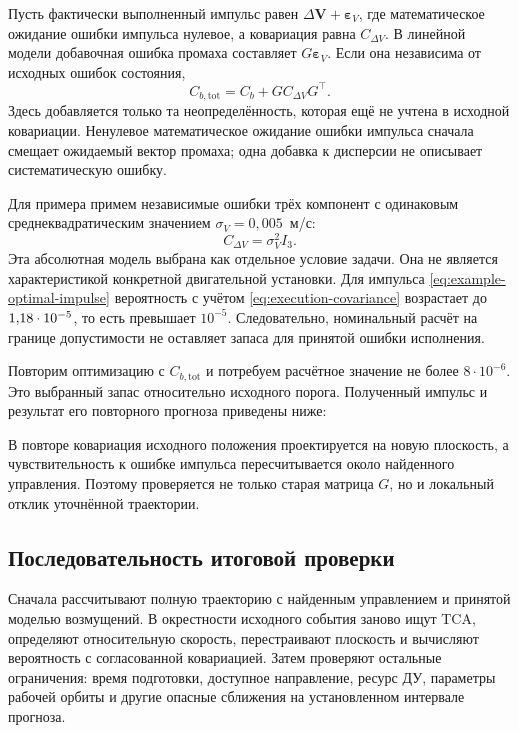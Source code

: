 \documentclass[a4paper,11pt]{article}
\newcommand{\vect}[1]{\boldsymbol{#1}}
\numberwithin{equation}{section}
\begin{document}
Пусть фактически выполненный импульс равен
$\Delta\vect V+\vect\varepsilon_V$, где математическое ожидание ошибки импульса
нулевое, а ковариация равна $C_{\Delta V}$. В линейной модели
добавочная ошибка промаха составляет $G\vect\varepsilon_V$.
Если она независима от исходных ошибок состояния,
\begin{equation}
 C_{b,\mathrm{tot}}=C_b+G C_{\Delta V}G^\top.
 \label{eq:execution-covariance}
\end{equation}
Здесь добавляется только та неопределённость, которая ещё
не учтена в исходной ковариации. Ненулевое математическое ожидание ошибки импульса
сначала смещает ожидаемый вектор промаха; одна добавка
к дисперсии не описывает систематическую ошибку.

Для примера примем независимые ошибки трёх компонент
с одинаковым среднеквадратическим значением
$\sigma_V=0{,}005$~м/с:
\begin{equation}
 C_{\Delta V}=\sigma_V^2 I_3.
 \label{eq:example-execution-error}
\end{equation}
Эта абсолютная модель выбрана как отдельное условие задачи.
Она не является характеристикой конкретной двигательной установки.
Для импульса \eqref{eq:example-optimal-impulse} вероятность
с учётом \eqref{eq:execution-covariance} возрастает до
$1{,}18\cdot10^{-5}$, то есть превышает $10^{-5}$.
Следовательно, номинальный расчёт на границе допустимости
не оставляет запаса для принятой ошибки исполнения.

Повторим оптимизацию с $C_{b,\mathrm{tot}}$ и потребуем
расчётное значение не более $8\cdot10^{-6}$.
Это выбранный запас относительно исходного порога.
Полученный импульс и результат его повторного прогноза
приведены ниже:

В повторе ковариация исходного положения проектируется
на новую плоскость, а чувствительность к ошибке импульса
пересчитывается около найденного управления. Поэтому
проверяется не только старая матрица $G$, но и локальный
отклик уточнённой траектории.

\subsection{Последовательность итоговой проверки}

Сначала рассчитывают полную траекторию с найденным управлением
и принятой моделью возмущений. В окрестности исходного события
заново ищут TCA, определяют относительную скорость,
перестраивают плоскость и вычисляют вероятность с согласованной
ковариацией. Затем проверяют остальные ограничения:
время подготовки, доступное направление, ресурс ДУ,
параметры рабочей орбиты и другие опасные сближения
на установленном интервале прогноза.
\end{document}
